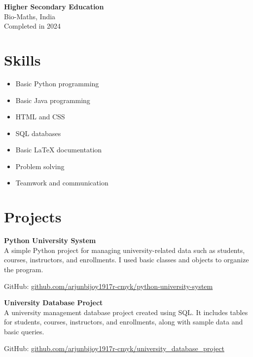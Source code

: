 \documentclass[11pt,a4paper]{article}
\begin{document}
\vspace{0.2cm}

\textbf{Higher Secondary Education} \\
Bio-Maths, India \\
Completed in 2024


\section*{Skills}

\begin{itemize}
    \item Basic Python programming
    \item Basic Java programming
    \item HTML and CSS
    \item SQL databases
    \item Basic LaTeX documentation
    \item Problem solving
    \item Teamwork and communication
\end{itemize}


\section*{Projects}

\textbf{Python University System} \\

A simple Python project for managing university-related data such as students, courses, instructors, and enrollments. I used basic classes and objects to organize the program.

GitHub: \href{https://github.com/arjunbijoy1917r-cmyk/python-university-system}{github.com/arjunbijoy1917r-cmyk/python-university-system}

\vspace{0.3cm}

\textbf{University Database Project} \\

A university management database project created using SQL. It includes tables for students, courses, instructors, and enrollments, along with sample data and basic queries.

GitHub: \href{https://github.com/arjunbijoy1917r-cmyk/university_database_project}{github.com/arjunbijoy1917r-cmyk/university_database_project}
\end{document}
